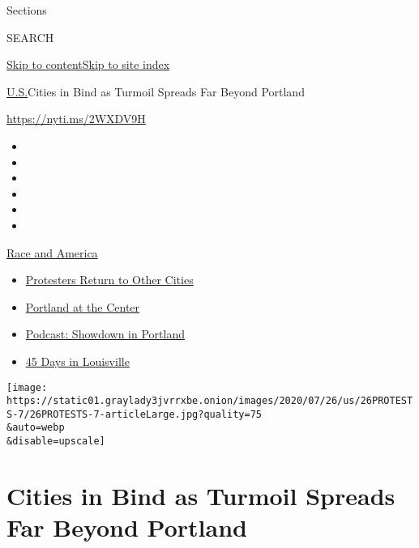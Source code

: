 Sections

SEARCH

\protect\hyperlink{site-content}{Skip to
content}\protect\hyperlink{site-index}{Skip to site index}

\href{/section/us}{U.S.}\textbar{}Cities in Bind as Turmoil Spreads Far
Beyond Portland

\url{https://nyti.ms/2WXDV9H}

\begin{itemize}
\item
\item
\item
\item
\item
\item
\end{itemize}

\href{https://www.nytimes3xbfgragh.onion/news-event/george-floyd-protests-minneapolis-new-york-los-angeles?action=click\&pgtype=Article\&state=default\&region=TOP_BANNER\&context=storylines_menu}{Race
and America}

\begin{itemize}
\tightlist
\item
  \href{https://www.nytimes3xbfgragh.onion/2020/07/26/us/protests-portland-seattle-trump.html?action=click\&pgtype=Article\&state=default\&region=TOP_BANNER\&context=storylines_menu}{Protesters
  Return to Other Cities}
\item
  \href{https://www.nytimes3xbfgragh.onion/2020/07/24/us/portland-oregon-protests-white-race.html?action=click\&pgtype=Article\&state=default\&region=TOP_BANNER\&context=storylines_menu}{Portland
  at the Center}
\item
  \href{https://www.nytimes3xbfgragh.onion/2020/07/23/podcasts/the-daily/portland-protests.html?action=click\&pgtype=Article\&state=default\&region=TOP_BANNER\&context=storylines_menu}{Podcast:
  Showdown in Portland}
\item
  \href{https://www.nytimes3xbfgragh.onion/interactive/2020/07/16/us/black-lives-matter-protests-louisville-breonna-taylor.html?action=click\&pgtype=Article\&state=default\&region=TOP_BANNER\&context=storylines_menu}{45
  Days in Louisville}
\end{itemize}

\texttt{[image: https://static01.graylady3jvrrxbe.onion/images/2020/07/26/us/26PROTESTS-7/26PROTESTS-7-articleLarge.jpg?quality=75\\\&auto=webp\\\&disable=upscale]}

\hypertarget{cities-in-bind-as-turmoil-spreads-far-beyond-portland}{%
\section{Cities in Bind as Turmoil Spreads Far Beyond
Portland}\label{cities-in-bind-as-turmoil-spreads-far-beyond-portland}}

